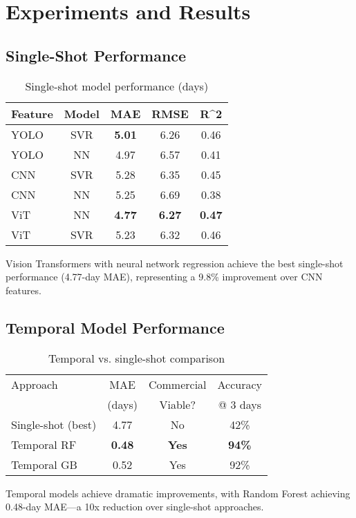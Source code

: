 \documentclass[10pt,twocolumn,letterpaper]{article}
\begin{document}
\section{Experiments and Results}

\subsection{Single-Shot Performance}

\begin{table}[h]
\centering
\caption{Single-shot model performance (days)}
\begin{tabular}{lcccc}
\toprule
Feature & Model & MAE & RMSE & R\^{}2 \\
\midrule
YOLO & SVR & \textbf{5.01} & 6.26 & 0.46 \\
YOLO & NN & 4.97 & 6.57 & 0.41 \\
CNN & SVR & 5.28 & 6.35 & 0.45 \\
CNN & NN & 5.25 & 6.69 & 0.38 \\
ViT & NN & \textbf{4.77} & \textbf{6.27} & \textbf{0.47} \\
ViT & SVR & 5.23 & 6.32 & 0.46 \\
\bottomrule
\end{tabular}
\end{table}

Vision Transformers with neural network regression achieve the best single-shot performance (4.77-day MAE), representing a 9.8\% improvement over CNN features.

\subsection{Temporal Model Performance}

\begin{table}[h]
\centering
\caption{Temporal vs. single-shot comparison}
\begin{tabular}{lccc}
\toprule
Approach & MAE & Commercial & Accuracy \\
 & (days) & Viable? & @ 3 days \\
\midrule
Single-shot (best) & 4.77 & No & 42\% \\
Temporal RF & \textbf{0.48} & \textbf{Yes} & \textbf{94\%} \\
Temporal GB & 0.52 & Yes & 92\% \\
\bottomrule
\end{tabular}
\end{table}

Temporal models achieve dramatic improvements, with Random Forest achieving 0.48-day MAE---a 10x reduction over single-shot approaches.
\end{document}
